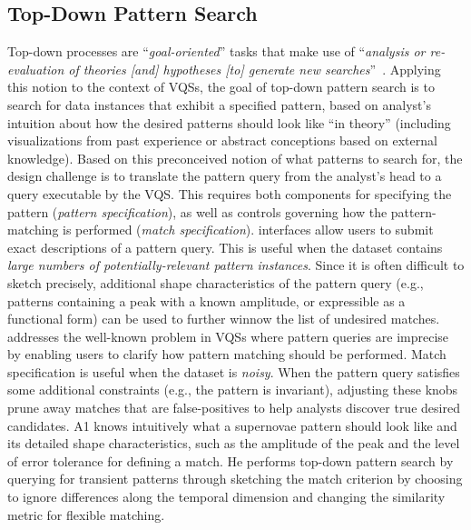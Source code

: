    \subsection{Top-Down Pattern Search}
   Top-down processes are ``\textit{goal-oriented}'' tasks that make use of ``\textit{analysis or re-evaluation of theories [and] hypotheses [to] generate new searches}''~\cite{Pirolli}. Applying this notion to the context of VQSs, the goal of top-down pattern search is to search for data instances that exhibit a specified pattern, based on analyst's intuition about how the desired patterns should look like ``in theory'' (including visualizations from past experience or abstract conceptions based on external knowledge). Based on this preconceived notion of what patterns to search for, the design challenge is to translate the pattern query from the analyst's head to a query executable by the VQS. This requires both components for specifying the pattern (\textit{pattern specification}), as well as controls governing how the pattern-matching is performed (\textit{match specification}).
    interfaces allow users to submit exact descriptions of a pattern query. This is useful when the dataset contains \emph{large numbers of potentially-relevant pattern instances}.
   Since it is often difficult to sketch precisely, additional shape characteristics of the pattern query (e.g., patterns containing a peak with a known amplitude, or expressible as a functional form) can be used to further winnow the list of undesired matches.%
    addresses the well-known problem in VQSs where pattern queries are imprecise~\cite{correll2016semantics,Holz2009,Eichmann2015} by enabling users to clarify how pattern matching should be performed. Match specification is useful when the dataset is \emph{noisy}. When the pattern query satisfies some additional constraints (e.g., the pattern is  invariant), adjusting these knobs prune away matches that are false-positives to help analysts discover true desired candidates.
    A1 knows intuitively what a supernovae pattern should look like and its detailed shape characteristics, such as the amplitude of the peak and the level of error tolerance for defining a match. He  performs top-down pattern search by querying for transient patterns through sketching the match criterion by choosing to ignore differences along the temporal dimension and changing the similarity metric for flexible matching.
